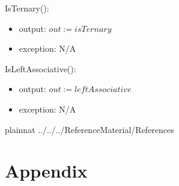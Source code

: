 \documentclass[12pt, titlepage]{article}
\begin{document}
\noindent IsTernary():
\begin{itemize}
	\item output: $out := isTernary$
	\item exception: N/A
\end{itemize}

\noindent IsLeftAssociative():
\begin{itemize}
	\item output: $out := leftAssociative$
	\item exception: N/A
\end{itemize}

\newpage

 {plainnat}
 {../../../ReferenceMaterial/References}

\newpage

\section{Appendix} \label{Appendix}

\renewcommand{\arraystretch}{1.2}
\end{document}
